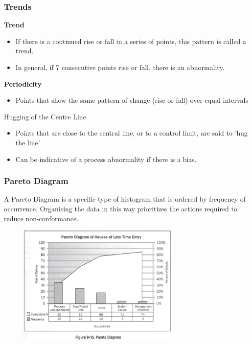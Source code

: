 \begin{frame}
\frametitle{Trends}
\textbf{Trend}
\begin{itemize}
	\item If there is a continued rise or fall in a series of points, this pattern is called a trend.
	\item In general, if 7 consecutive points rise or fall, there is an abnormality.
\end{itemize}
\textbf{Periodicity}
\begin{itemize}
	\item Points that show the same pattern of change (rise or fall) over equal intervals
\end{itemize}
Hugging of the Centre Line
\begin{itemize}
	\item Points that are close to the central line, or to a control limit, are said to 'hug the line'
	\item Can be indicative of a process abnormality if there is a bias.
\end{itemize}
\end{frame}



\begin{frame}
\frametitle{Pareto Diagram}
A Pareto Diagram is a specific type of histogram that is ordered by frequency of occurrence.
Organising the data in this way prioritizes the actions required to reduce non-conformance.
\begin{figure}
	\centering
		\includegraphics[width = 8cm]{images/pareto.jpg}
	\label{fig:pareto}
\end{figure}

\end{frame}




